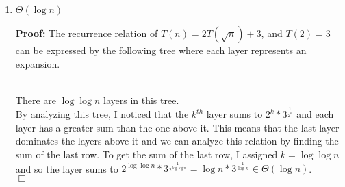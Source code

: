 \documentclass[11pt]{article}
\def\endproofmark{$\Box$}
\newenvironment{proof}{\par{\bf Proof:}}{\endproofmark\smallskip}
\begin{document}
\begin{enumerate}[label=(\alph*)]
\item
$\Theta(\log{n})$
\begin{proof}
The recurrence relation of $T(n) = 2T(\sqrt{n}) + 3$, and $T(2) = 3$ can be expressed by the following tree where each layer represents an expansion. \\
 \\
There are $\log{\log{n}}$ layers in this tree. \\
By analyzing this tree, I noticed that the $k^{th}$ layer sums to $2^k * 3^{\frac{1} {2^k}}$ and each layer has a greater sum than the one above it. This means that the last layer dominates the layers above it and we can analyze this relation by finding the sum of the last row. To get the sum of the last row, I assigned $k = \log{\log{n}}$ and so the layer sums to $2^{\log{\log{n}}} * 3^{\frac{1} {2^{\log{\log{n}}}}} = \log{n} * 3^{\frac{1} {\log{n}}} \in \Theta(\log{n})$. \\
\end{proof}
\end{enumerate}



\newpage
\end{document}
